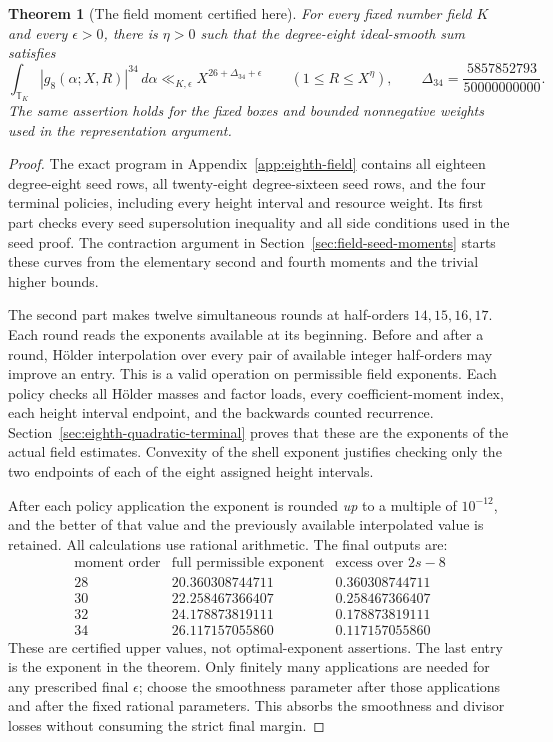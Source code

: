 \documentclass[11pt,reqno]{amsart}
\numberwithin{equation}{section}
\newtheorem{theorem}{Theorem}[section]
\theoremstyle{definition}
\begin{document}
\begin{theorem}[The field moment certified here]
\label{thm:eighth-moment}
For every fixed number field $K$ and every $\epsilon>0$, there is
$\eta>0$ such that the degree-eight ideal-smooth sum satisfies
\[
 \int_{\mathbb T_K}|g_8(\alpha;X,R)|^{34}\,d\alpha
 \ll_{K,\epsilon}X^{26+\Delta_{34}+\epsilon}
 \qquad(1\le R\le X^\eta),
 \qquad
 \Delta_{34}=\frac{5857852793}{50000000000}.
\]
The same assertion holds for the fixed boxes and bounded nonnegative
weights used in the representation argument.
\end{theorem}

\begin{proof}
The exact program in Appendix~\ref{app:eighth-field} contains all eighteen
degree-eight seed rows, all twenty-eight degree-sixteen seed rows, and
the four terminal policies, including every height interval and resource
weight. Its first part checks every seed supersolution inequality and
all side conditions used in the seed proof. The contraction argument in
Section~\ref{sec:field-seed-moments} starts these curves from the elementary
second and fourth moments and the trivial higher bounds.

The second part makes twelve simultaneous rounds at half-orders
$14,15,16,17$. Each round reads the exponents available at its beginning.
Before and after a round, H\"older interpolation over every pair of
available integer half-orders may improve an entry. This is a valid
operation on permissible field exponents. Each policy checks all
H\"older masses and factor loads, every coefficient-moment index, each
height interval endpoint, and the backwards counted recurrence.
Section~\ref{sec:eighth-quadratic-terminal} proves that these are the
exponents of the actual field estimates. Convexity of the shell exponent
justifies checking only the two endpoints of each of the eight assigned
height intervals.

After each policy application the exponent is rounded \emph{up} to a
multiple of $10^{-12}$, and the better of that value and the previously
available interpolated value is retained. All calculations use rational
arithmetic. The final outputs are:
\[
\begin{array}{c|c|c}
 \text{moment order}&\text{full permissible exponent}&\text{excess over }2s-8\\\hline
 28&20.360308744711&0.360308744711\\
 30&22.258467366407&0.258467366407\\
 32&24.178873819111&0.178873819111\\
 34&26.117157055860&0.117157055860
\end{array}
\]
These are certified upper values, not optimal-exponent assertions.
The last entry is the exponent in the theorem. Only finitely many
applications are needed for any prescribed final $\epsilon$; choose
the smoothness parameter after those applications and after the fixed
rational parameters. This absorbs the smoothness and divisor losses
without consuming the strict final margin.
\end{proof}
\end{document}
